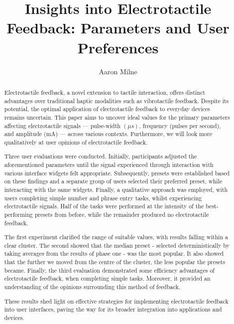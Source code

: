 \documentclass{mpaper}
\begin{document}
\title{Insights into Electrotactile Feedback: Parameters and User Preferences}
\author{Aaron Milne}

\maketitle

\begin{abstract}
Electrotactile feedback, a novel extension to tactile interaction, offers distinct advantages over traditional haptic modalities such as vibrotactile feedback. Despite its potential, the optimal application of electrotactile feedback to everyday devices remains uncertain. This paper aims to uncover ideal values for the primary parameters affecting electrotactile signals — pulse-width $({\mu}s)$, frequency (pulses per second), and amplitude (mA) — across various contexts. Furthermore, we will look more qualitatively at user opinions of electrotactile feedback.

Three user evaluations were conducted. Initially, participants adjusted the aforementioned parameters until the signal experienced through interaction with various interface widgets felt appropriate. Subsequently, presets were established based on these findings and a separate group of users selected their preferred preset, while interacting with the same widgets. Finally, a qualitative approach was employed, with users completing simple number and phrase entry tasks, whilst experiencing electrotactile signals. Half of the tasks were performed at the intensity of the best-performing presets from before, while the remainder produced no electrotactile feedback.

The first experiment clarified the range of suitable values, with results falling within a clear cluster. The second showed that the median preset - selected deterministically by taking averages from the results of phase one - was the most popular. It also showed that the further we moved from the centre of the cluster, the less popular the presets became. Finally, the third evaluation demonstrated some efficiency advantages of electrotactile feedback, when completing simple tasks. Moreover, it provided an understanding of the opinions surrounding this method of feedback.

These results shed light on effective strategies for implementing electrotactile feedback into user interfaces, paving the way for its broader integration into applications and devices. 
\end{abstract}
\end{document}
